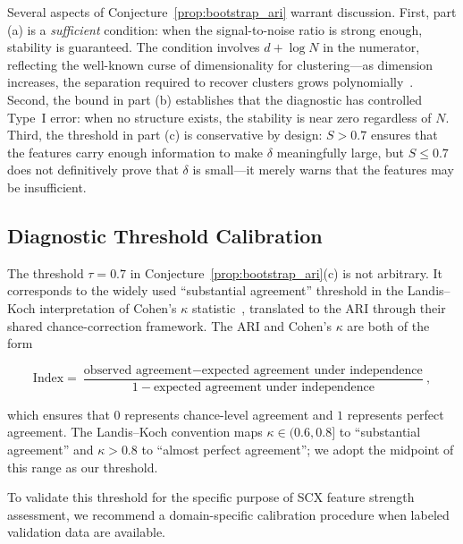Several aspects of Conjecture~\ref{prop:bootstrap_ari} warrant discussion. First, part (a) is a \emph{sufficient} condition: when the signal-to-noise ratio is strong enough, stability is guaranteed. The condition involves $d + \log N$ in the numerator, reflecting the well-known curse of dimensionality for clustering---as dimension increases, the separation required to recover clusters grows polynomially~\cite{verma2020dimensionality}. Second, the bound in part (b) establishes that the diagnostic has controlled Type~I error: when no structure exists, the stability is near zero regardless of $N$. Third, the threshold in part (c) is conservative by design: $S > 0.7$ ensures that the features carry enough information to make $\delta$ meaningfully large, but $S \leq 0.7$ does not definitively prove that $\delta$ is small---it merely warns that the features may be insufficient.

\subsection{Diagnostic Threshold Calibration}

The threshold $\tau = 0.7$ in Conjecture~\ref{prop:bootstrap_ari}(c) is not arbitrary. It corresponds to the widely used ``substantial agreement'' threshold in the Landis--Koch interpretation of Cohen's $\kappa$ statistic~\cite{landis1977measurement}, translated to the ARI through their shared chance-correction framework. The ARI and Cohen's $\kappa$ are both of the form

\[
\text{Index} = \frac{\text{observed agreement} - \text{expected agreement under independence}}{1 - \text{expected agreement under independence}},
\]

which ensures that $0$ represents chance-level agreement and $1$ represents perfect agreement. The Landis--Koch convention maps $\kappa \in (0.6, 0.8]$ to ``substantial agreement'' and $\kappa > 0.8$ to ``almost perfect agreement''; we adopt the midpoint of this range as our threshold.

To validate this threshold for the specific purpose of SCX feature strength assessment, we recommend a domain-specific calibration procedure when labeled validation data are available.

